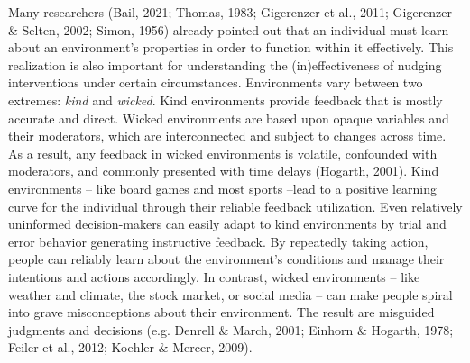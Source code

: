 \documentclass[reflection, authordate]{jote-new-article}
\begin{document}
Many researchers (Bail, 2021; Thomas, 1983; Gigerenzer et al., 2011; Gigerenzer \& Selten, 2002; Simon, 1956) already pointed out that an individual must learn about an environment’s properties in order to function within it effectively. This realization is also important for understanding the (in)effectiveness of nudging interventions under certain circumstances. Environments vary between two extremes: \emph{kind }and \emph{wicked}. Kind environments provide feedback that is mostly accurate and direct. Wicked environments are based upon opaque variables and their moderators, which are interconnected and subject to changes across time. As a result, any feedback in wicked environments is volatile, confounded with moderators, and commonly presented with time delays (Hogarth, 2001). Kind environments – like board games and most sports –lead to a positive learning curve for the individual through their reliable feedback utilization. Even relatively uninformed decision-makers can easily adapt to kind environments by trial and error behavior generating instructive feedback. By repeatedly taking action, people can reliably learn about the environment’s conditions and manage their intentions and actions accordingly. In contrast, wicked environments – like weather and climate, the stock market, or social media – can make people spiral into grave misconceptions about their environment. The result are misguided judgments and decisions (e.g. Denrell \& March, 2001; Einhorn \& Hogarth, 1978; Feiler et al., 2012; Koehler \& Mercer, 2009).
\end{document}
